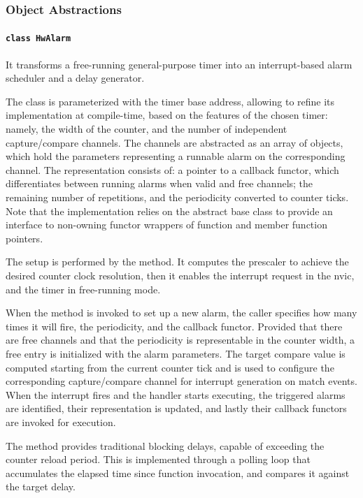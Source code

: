 \subsubsection{Object Abstractions}\label{ssubsec:obj}

\paragraph{\texttt{class HwAlarm}}
It transforms a free-running general-purpose timer into an interrupt-based alarm scheduler and a delay generator.

The class is parameterized with the timer base address, allowing to refine its implementation at compile-time, based on the features of the chosen timer: namely, the width of the counter, and the number of independent capture/compare channels.
The channels are abstracted as an array of  objects, which hold the parameters representing a runnable alarm on the corresponding channel. The representation consists of: a pointer to a callback functor, which differentiates between running alarms when valid and free channels; the remaining number of repetitions, and the periodicity converted to counter ticks.
Note that the implementation relies on the  abstract base class to provide an interface to non-owning functor wrappers of function and member function pointers.

The setup is performed by the  method. It computes the prescaler to achieve the desired counter clock resolution, then it enables the interrupt request in the \ac{nvic}, and the timer in free-running mode.

When the  method is invoked to set up a new alarm, the caller specifies how many times it will fire, the periodicity, and the callback functor. Provided that there are free channels and that the periodicity is representable in the counter width, a free  entry is initialized with the alarm parameters. The target compare value is computed starting from the current counter tick and is used to configure the corresponding capture/compare channel for interrupt generation on match events. When the interrupt fires and the handler starts executing, the triggered alarms are identified, their representation is updated, and lastly their callback functors are invoked for execution.

The  method provides traditional blocking delays, capable of exceeding the counter reload period. This is implemented through a polling loop that accumulates the elapsed time since function invocation, and compares it against the target delay.

